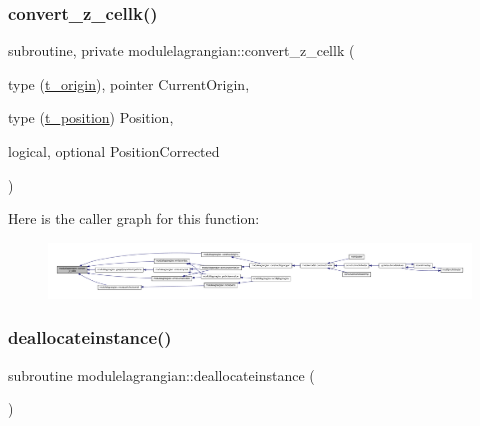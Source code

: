 \subsubsection{\texorpdfstring{convert\+\_\+z\+\_\+cellk()}{convert\_z\_cellk()}}
{\footnotesize\ttfamily subroutine, private modulelagrangian\+::convert\+\_\+z\+\_\+cellk (\begin{DoxyParamCaption}\item[{type (\mbox{\hyperlink{structmodulelagrangian_1_1t__origin}{t\+\_\+origin}}), pointer}]{Current\+Origin,  }\item[{type (\mbox{\hyperlink{structmodulelagrangian_1_1t__position}{t\+\_\+position}})}]{Position,  }\item[{logical, optional}]{Position\+Corrected }\end{DoxyParamCaption})\hspace{0.3cm}{\ttfamily [private]}}

Here is the caller graph for this function\+:\nopagebreak
\begin{figure}[H]
\begin{center}
\leavevmode
\includegraphics[width=350pt]{namespacemodulelagrangian_a457d6182588e8e1d9cc86c35a53690f7_icgraph}
\end{center}
\end{figure}
\mbox{\label{namespacemodulelagrangian_a43ea933b1bd63328af5b5fde1d41787a}} 
\subsubsection{\texorpdfstring{deallocateinstance()}{deallocateinstance()}}
{\footnotesize\ttfamily subroutine modulelagrangian\+::deallocateinstance (\begin{DoxyParamCaption}{ }\end{DoxyParamCaption})\hspace{0.3cm}{\ttfamily [private]}}

